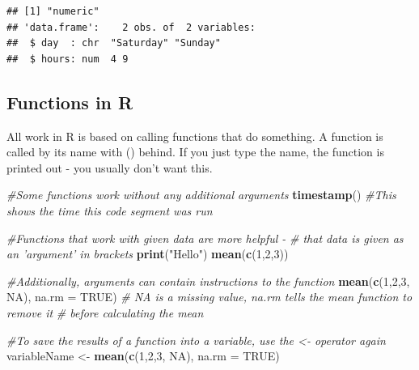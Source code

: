 \documentclass[
]{book}
\newenvironment{Shaded}{\begin{snugshade}}{\end{snugshade}}
\newcommand{\CommentTok}[1]{\textcolor[rgb]{0.56,0.35,0.01}{\textit{#1}}}
\newcommand{\DataTypeTok}[1]{\textcolor[rgb]{0.13,0.29,0.53}{#1}}
\newcommand{\DecValTok}[1]{\textcolor[rgb]{0.00,0.00,0.81}{#1}}
\newcommand{\KeywordTok}[1]{\textcolor[rgb]{0.13,0.29,0.53}{\textbf{#1}}}
\newcommand{\NormalTok}[1]{#1}
\newcommand{\OperatorTok}[1]{\textcolor[rgb]{0.81,0.36,0.00}{\textbf{#1}}}
\newcommand{\OtherTok}[1]{\textcolor[rgb]{0.56,0.35,0.01}{#1}}
\newcommand{\StringTok}[1]{\textcolor[rgb]{0.31,0.60,0.02}{#1}}
\begin{document}
\begin{Shaded}
\end{Shaded}

\begin{verbatim}
## [1] "numeric"
## 'data.frame':	2 obs. of  2 variables:
##  $ day  : chr  "Saturday" "Sunday"
##  $ hours: num  4 9
\end{verbatim}

\hypertarget{functions-in-r}{%
\subsection{Functions in R}\label{functions-in-r}}

All work in R is based on calling functions that do something. A function is called by its name with () behind. If you just type the name, the function is printed out - you usually don't want this.

\begin{Shaded}
\begin{Highlighting}[]
\CommentTok{#Some functions work without any additional arguments}
\KeywordTok{timestamp}\NormalTok{() }\CommentTok{#This shows the time this code segment was run}

\CommentTok{#Functions that work with given data are more helpful - }
\CommentTok{# that data is given as an 'argument' in brackets}
\KeywordTok{print}\NormalTok{(}\StringTok{"Hello"}\NormalTok{)}
\KeywordTok{mean}\NormalTok{(}\KeywordTok{c}\NormalTok{(}\DecValTok{1}\NormalTok{,}\DecValTok{2}\NormalTok{,}\DecValTok{3}\NormalTok{))}

\CommentTok{#Additionally, arguments can contain instructions to the function}
\KeywordTok{mean}\NormalTok{(}\KeywordTok{c}\NormalTok{(}\DecValTok{1}\NormalTok{,}\DecValTok{2}\NormalTok{,}\DecValTok{3}\NormalTok{, }\OtherTok{NA}\NormalTok{), }\DataTypeTok{na.rm =} \OtherTok{TRUE}\NormalTok{)}
\CommentTok{# NA is a missing value, na.rm tells the mean function to remove it }
\CommentTok{# before calculating the mean}

\CommentTok{#To save the results of a function into a variable, use the <- operator again}
\NormalTok{variableName <-}\StringTok{ }\KeywordTok{mean}\NormalTok{(}\KeywordTok{c}\NormalTok{(}\DecValTok{1}\NormalTok{,}\DecValTok{2}\NormalTok{,}\DecValTok{3}\NormalTok{, }\OtherTok{NA}\NormalTok{), }\DataTypeTok{na.rm =} \OtherTok{TRUE}\NormalTok{)}
\end{Highlighting}
\end{Shaded}
\end{document}
